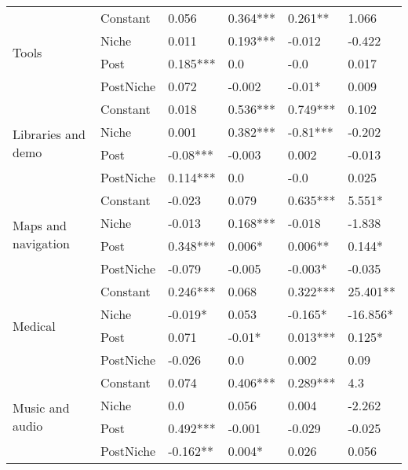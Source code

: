 \begin{longtable}[h!]{llllll}
\cline{1-6}
\multirow{4}{*}{Tools} & Constant &               0.056 &    0.364*** &    0.261** &      1.066 \\
          & Niche &               0.011 &    0.193*** &     -0.012 &     -0.422 \\
          & Post &            0.185*** &         0.0 &       -0.0 &      0.017 \\
          & PostNiche &               0.072 &      -0.002 &     -0.01* &      0.009 \\
\cline{1-6}
\multirow{4}{*}{Libraries and demo} & Constant &               0.018 &    0.536*** &   0.749*** &      0.102 \\
          & Niche &               0.001 &    0.382*** &   -0.81*** &     -0.202 \\
          & Post &            -0.08*** &      -0.003 &      0.002 &     -0.013 \\
          & PostNiche &            0.114*** &         0.0 &       -0.0 &      0.025 \\
\cline{1-6}
\multirow{4}{*}{Maps and navigation} & Constant &              -0.023 &       0.079 &   0.635*** &     5.551* \\
          & Niche &              -0.013 &    0.168*** &     -0.018 &     -1.838 \\
          & Post &            0.348*** &      0.006* &    0.006** &     0.144* \\
          & PostNiche &              -0.079 &      -0.005 &    -0.003* &     -0.035 \\
\cline{1-6}
\multirow{4}{*}{Medical} & Constant &            0.246*** &       0.068 &   0.322*** &   25.401** \\
          & Niche &             -0.019* &       0.053 &    -0.165* &   -16.856* \\
          & Post &               0.071 &      -0.01* &   0.013*** &     0.125* \\
          & PostNiche &              -0.026 &         0.0 &      0.002 &       0.09 \\
\cline{1-6}
\multirow{4}{*}{Music and audio} & Constant &               0.074 &    0.406*** &   0.289*** &        4.3 \\
          & Niche &                 0.0 &       0.056 &      0.004 &     -2.262 \\
          & Post &            0.492*** &      -0.001 &     -0.029 &     -0.025 \\
          & PostNiche &            -0.162** &      0.004* &      0.026 &      0.056 \\

\end{longtable}
